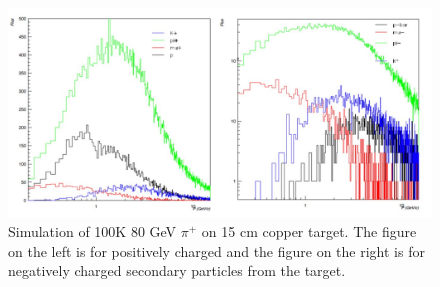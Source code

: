 \begin{figure}[tbh]
  \centering
\includegraphics[scale=0.47]{figures/80GeVPion-15cmCuTarget.jpg}
  \caption{Simulation of 100K 80 GeV $\pi^+$ on 15 cm copper target. The figure on the left is for positively charged and the figure on the right is for negatively charged secondary particles from the target. }
\label{fig:PionOnCuTarget}
\end{figure}


